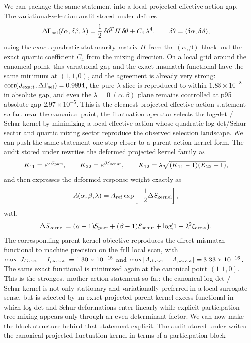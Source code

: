 \documentclass[aps,prd,onecolumn,notitlepage,nofootinbib,superscriptaddress,11pt,floatfix]{revtex4-2}
\begin{document}
We can package the same statement into a local projected effective-action gap. The variational-selection audit stored under  defines
\[
\Delta\Gamma_{\rm sel}(\delta\alpha,\delta\beta,\lambda)
=\frac12\,\delta\theta^T H\,\delta\theta + C_4\,\lambda^4,
\qquad
\delta\theta=(\delta\alpha,\delta\beta),
\]
using the exact quadratic stationarity matrix $H$ from the $(\alpha,\beta)$ block and the exact quartic coefficient $C_4$ from the mixing direction. On a local grid around the canonical point, this variational gap and the exact mismatch functional have the same minimum at $(1,1,0)$, and the agreement is already very strong: $\mathrm{corr}(J_{\rm exact},\Delta\Gamma_{\rm sel})=0.9894$, the pure-$\lambda$ slice is reproduced to within $1.88\times10^{-8}$ in absolute gap, and even the $\lambda=0$ $(\alpha,\beta)$ plane remains controlled at p95 absolute gap $2.97\times10^{-5}$. This is the cleanest projected effective-action statement so far: near the canonical point, the fluctuation operator selects the log-det / Schur kernel by minimizing a local effective action whose quadratic log-det/Schur sector and quartic mixing sector reproduce the observed selection landscape.
We can push the same statement one step closer to a parent-action kernel form. The audit stored under  rewrites the deformed projected kernel family as
\[
K_{11}=e^{\alpha S_{\rm part}},\qquad
K_{22}=e^{\beta S_{\rm schur}},\qquad
K_{12}=\lambda\sqrt{(K_{11}-1)(K_{22}-1)},
\]
and then expresses the deformed response weight exactly as
\[
A(\alpha,\beta,\lambda)=A_{\rm ref}\exp\!\left[-\frac12\Delta S_{\rm kernel}\right],
\]
with
\[
\Delta S_{\rm kernel}
=(\alpha-1)S_{\rm part}+(\beta-1)S_{\rm schur}
+\log\!\bigl(1-\lambda^2\xi_{\rm cross}\bigr).
\]
The corresponding parent-kernel objective reproduces the direct mismatch functional to machine precision on the full local scan, with $\max|J_{\rm direct}-J_{\rm parent}|=1.30\times10^{-18}$ and $\max|A_{\rm direct}-A_{\rm parent}|=3.33\times10^{-16}$. The same exact functional is minimized again at the canonical point $(1,1,0)$. This is the strongest mother-action statement so far: the canonical log-det / Schur kernel is not only stationary and variationally preferred in a local surrogate sense, but is selected by an exact projected parent-kernel excess functional in which log-det and Schur deformations enter linearly while explicit participation--tree mixing appears only through an even determinant factor.
We can now make the block structure behind that statement explicit. The audit stored under  writes the canonical projected fluctuation kernel in terms of a participation block
\end{document}
